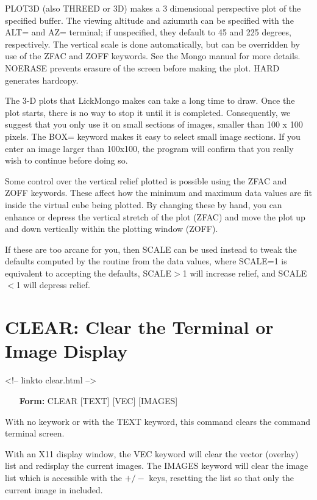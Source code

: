 PLOT3D (also THREED or 3D) makes a 3 dimensional perspective plot of the
specified buffer. The viewing altitude and aziumuth can be specified with
the ALT= and AZ= terminal; if unspecified, they default to 45 and 225
degrees, respectively. The vertical scale is done automatically, but can be
overridden by use of the ZFAC and ZOFF keywords. See the Mongo manual for
more details. NOERASE prevents erasure of the screen before making the
plot. HARD generates hardcopy.

The 3-D plots that LickMongo makes can take a long time to draw.  Once the
plot starts, there is no way to stop it until it is completed.
Consequently, we suggest that you only use it on small sections of images,
smaller than 100 x 100 pixels. The BOX= keyword makes it easy to select
small image sections. If you enter an image larger than 100x100, the
program will confirm that you really wish to continue before doing so.

Some control over the vertical relief plotted is possible using the ZFAC
and ZOFF keywords.  These affect how the minimum and maximum data values
are fit inside the virtual cube being plotted.  By changing these by hand,
you can enhance or depress the vertical stretch of the plot (ZFAC) and move
the plot up and down vertically within the plotting window (ZOFF).

If these are too arcane for you, then SCALE can be used instead to tweak
the defaults computed by the routine from the data values, where SCALE=1 is
equivalent to accepting the defaults, SCALE$>$1 will increase relief, and
SCALE$<$1 will depress relief.


\section{CLEAR: Clear the Terminal or Image Display}
\begin{rawhtml}
<!-- linkto clear.html -->
\end{rawhtml}
\begin{itemize}
  \item[\textbf{Form: } CLEAR {[TEXT]} {[VEC]} {[IMAGES]}\hfill]{}
\end{itemize}

With no keywork or with the TEXT keyword, this command clears the command
terminal screen.

With an X11 display window, the VEC keyword will clear the vector (overlay)
list and redisplay the current images. The IMAGES keyword will clear the
image list which is accessible with the $+/-$ keys, resetting the list so
that only the current image in included.


